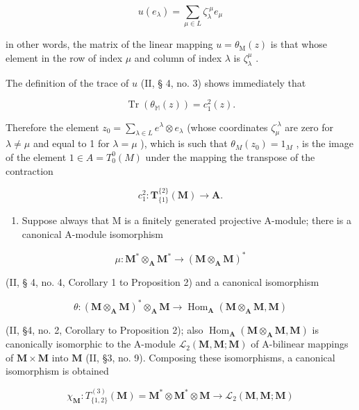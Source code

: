 \[
u (e _ {\lambda}) = \sum_ {\mu \in L} \zeta_ {\lambda} ^ {\cdot \mu} e _ {\mu}\tag{18}
\]

in other words, the matrix of the linear mapping \(u = \theta_{\mathrm{M}}(z)\) is that whose element in the row of index \(\mu\) and column of index \(\lambda\) is \(\zeta_{\lambda}^{\mu}\) .

The definition of the trace of \(u\) (II, § 4, no. 3) shows immediately that

\[
\operatorname{Tr} (\theta_ {\mathbb {M}} (z)) = c _ {1} ^ {2} (z).
\]

Therefore the element \(z_0 = \sum_{\lambda \in L} e^\lambda \otimes e_\lambda\) (whose coordinates \(\zeta_\mu^{\cdot \lambda}\) are zero for \(\lambda \neq \mu\) and equal to 1 for \(\lambda = \mu\) ), which is such that \(\theta_M(z_0) = 1_M\) , is the image of the element \(1 \in A = T_0^0(M)\) under the mapping the transpose of the contraction

\[
c _ {1} ^ {2}: \mathbf {T} _ {\{1 \}} ^ {\{2 \}} (\mathbf {M}) \rightarrow \mathbf {A}.
\]

\begin{enumerate}
\def\labelenumi{(\arabic{enumi})}
\setcounter{enumi}{1}
\tightlist
\item
  Suppose always that M is a finitely generated projective A-module; there is a canonical A-module isomorphism
\end{enumerate}

\[
\mu : \mathbf {M} ^ {*} \otimes_ {\mathbf {A}} \mathbf {M} ^ {*} \rightarrow (\mathbf {M} \otimes_ {\mathbf {A}} \mathbf {M}) ^ {*}
\]

(II, § 4, no. 4, Corollary 1 to Proposition 2) and a canonical isomorphism

\[
\theta : (\mathbf {M} \otimes_ {\mathbf {A}} \mathbf {M}) ^ {*} \otimes_ {\mathbf {A}} \mathbf {M} \rightarrow \operatorname{Hom} _ {\mathbf {A}} (\mathbf {M} \otimes_ {\mathbf {A}} \mathbf {M}, \mathbf {M})
\]

(II, §4, no. 2, Corollary to Proposition 2); also \(\operatorname{Hom}_{\mathbf{A}}(\mathbf{M} \otimes_{\mathbf{A}} \mathbf{M}, \mathbf{M})\) is canonically isomorphic to the A-module \(\mathcal{L}_2(\mathbf{M}, \mathbf{M}; \mathbf{M})\) of A-bilinear mappings of \(\mathbf{M} \times \mathbf{M}\) into \(\mathbf{M}\) (II, §3, no. 9). Composing these isomorphisms, a canonical isomorphism is obtained

\[
\chi_ {\mathbf {M}} \colon T _ {\{1, 2 \}} ^ {(3)} (\mathbf {M}) = \mathbf {M} ^ {*} \otimes \mathbf {M} ^ {*} \otimes \mathbf {M} \rightarrow \mathcal {L} _ {2} (\mathbf {M}, \mathbf {M}; \mathbf {M})
\]

